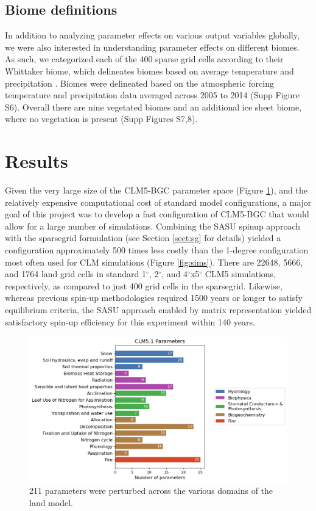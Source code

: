 \documentclass[draft]{agujournal2019}
\begin{document}
\subsection{Biome definitions}
In addition to analyzing parameter effects on various output variables globally, we were also interested in understanding parameter effects on different biomes.
As such, we categorized each of the 400 sparse grid cells according to their Whittaker biome, which delineates biomes based on average temperature and precipitation \cite{whittaker1970}. 
Biomes were delineated based on the atmospheric forcing temperature and precipitation data averaged across 2005 to 2014 (Supp Figure S6).
Overall there are nine vegetated biomes and an additional ice sheet biome, where no vegetation is present (Supp Figures S7,8).

\section{Results}

Given the very large size of the CLM5-BGC parameter space (Figure \ref{fig:params}), and the relatively expensive computational cost of standard model configurations, a major goal of this project was to develop a fast configuration of CLM5-BGC that would allow for a large number of simulations.
Combining the SASU spinup approach with the sparsegrid formulation (see Section \ref{sect:sg} for details) yielded a configuration approximately 500 times less costly than the 1-degree configuration most often used for CLM simulations (Figure \ref{fig:sims}).
There are 22648, 5666, and 1764 land grid cells in standard 1$^{\circ}$, 2$^{\circ}$, and 4$^{\circ}$x5$^{\circ}$ CLM5 simulations, respectively, as compared to just 400 grid cells in the sparsegrid.
Likewise, whereas previous spin-up methodologies required 1500 years or longer to satisfy equilibrium criteria, the SASU approach enabled by matrix representation yielded satisfactory spin-up efficiency for this experiment within 140 years.

\begin{figure}[h]
\centering
\includegraphics[width=\textwidth]{../figs/main/bar.png}
\caption{211 parameters were perturbed across the various domains of the land model.}
\label{fig:params}
\end{figure}
\end{document}
